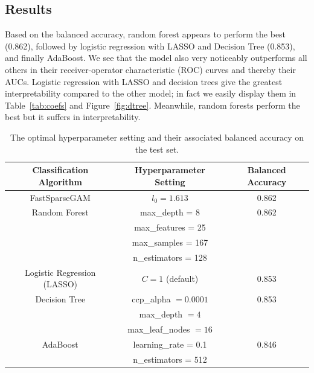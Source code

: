 \documentclass[12pt]{article}
\newtheorem{Proof of Lemma}{Proof of Lemma}
\begin{document}
\subsection{Results}
Based on the balanced accuracy, random forest appears to perform the best (0.862), followed by logistic regression with LASSO and Decision Tree (0.853), and finally
AdaBoost. We see that the model also very noticeably outperforms all others in their receiver-operator characteristic (ROC) curves and thereby their AUCs. 
Logistic regression with LASSO and decision trees give the greatest interpretability compared to the other model; in fact we easily display them in Table~\ref{tab:coefs} and 
Figure~\ref{fig:dtree}. Meanwhile, random forests perform the best but it suffers in interpretability. 

\begin{table}[h!]
  \centering
  \caption{The optimal hyperparameter setting and their associated balanced accuracy on the test set.}
  \begin{tabular}{|c|c|c|}
    \hline
    \textbf{Classification Algorithm}         & \textbf{Hyperparameter Setting} & \textbf{Balanced Accuracy} \\ \hline
    FastSparseGAM & $l_0=1.613$ & 0.862 \\ \hline
    Random Forest & max\_depth = 8 & 0.862 \\
    & max\_features = 25 & \\
    & max\_samples = 167 & \\
    & n\_estimators = 128 &  \\ \hline 
    Logistic Regression (LASSO) & $C = 1$ (default) & 0.853 \\ \hline
    Decision Tree & ccp\_alpha $ = 0.0001$ & 0.853 \\ 
     & max\_depth $ = 4$ & \\
     & max\_leaf\_nodes $ = 16$ & \\ \hline
    AdaBoost & learning\_rate = 0.1 & 0.846 \\
    & n\_estimators = 512 & \\ \hline 
  \end{tabular}
  \label{tab:results}
  \end{table}
\end{document}
